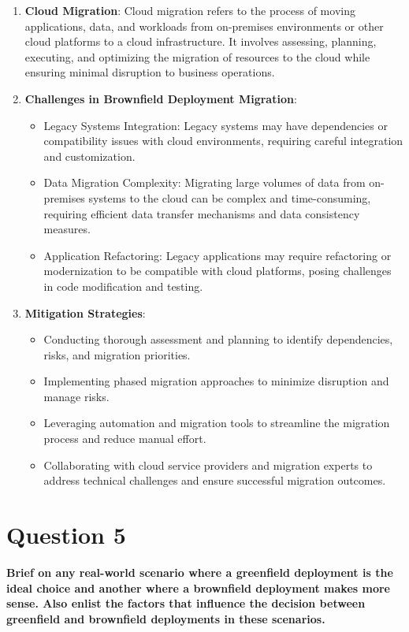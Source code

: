 \documentclass[11pt]{article}
\begin{document}
\begin{enumerate}
    \item \textbf{Cloud Migration}: Cloud migration refers to the process of moving applications, data, and workloads from on-premises environments or other cloud platforms to a cloud infrastructure. It involves assessing, planning, executing, and optimizing the migration of resources to the cloud while ensuring minimal disruption to business operations.

    \item \textbf{Challenges in Brownfield Deployment Migration}:
          \begin{itemize}
              \item Legacy Systems Integration: Legacy systems may have dependencies or compatibility issues with cloud environments, requiring careful integration and customization.
              \item Data Migration Complexity: Migrating large volumes of data from on-premises systems to the cloud can be complex and time-consuming, requiring efficient data transfer mechanisms and data consistency measures.
              \item Application Refactoring: Legacy applications may require refactoring or modernization to be compatible with cloud platforms, posing challenges in code modification and testing.
          \end{itemize}

    \item \textbf{Mitigation Strategies}:
          \begin{itemize}
              \item Conducting thorough assessment and planning to identify dependencies, risks, and migration priorities.
              \item Implementing phased migration approaches to minimize disruption and manage risks.
              \item Leveraging automation and migration tools to streamline the migration process and reduce manual effort.
              \item Collaborating with cloud service providers and migration experts to address technical challenges and ensure successful migration outcomes.
          \end{itemize}
\end{enumerate}

\section{Question 5}
\textbf{Brief on any real-world scenario where a greenfield deployment is the ideal choice and another where a brownfield deployment makes more sense. Also enlist the factors that influence the decision between greenfield and brownfield deployments in these scenarios.}
\end{document}
